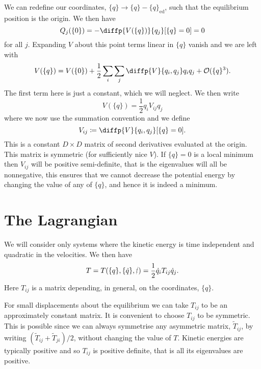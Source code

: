 \documentclass[fleqn]{NotesClass}
\newcommand*{\order}{\mathcal{O}}
\newcommand*{\nodependence}[1]{\textcolor{gray}{\cancel{#1}}}
\begin{document}
    We can redefine our coordinates, \(\{q\} \to \{q\} - \{q\}_{\mathrm{ed}}\), such that the equilibrium position is the origin.
    We then have
    \begin{equation}
        Q_j(\{0\}) = -\diffp{V(\{q\})}{q_j}[\{q\} = 0] = 0
    \end{equation}
    for all \(j\).
    Expanding \(V\) about this point terms linear in \(\{q\}\) vanish and we are left with
    \begin{equation}
        V(\{q\}) = V(\{0\}) + \frac{1}{2}\sum_i\sum_j \diffp{V}{q_i,q_j} q_iq_j + \order(\{q\}^3).
    \end{equation}
    The first term here is just a constant, which we will neglect.
    We then write
    \begin{equation}
        V(\{q\}) = \frac{1}{2}q_iV_{ij}q_j
    \end{equation}
    where we now use the summation convention and we define
    \begin{equation}
        V_{ij} \coloneqq \diffp{V}{q_i,q_j}[\{q\} = 0].
    \end{equation}
    This is a constant \(D \times D\) matrix of second derivatives evaluated at the origin.
    This matrix is symmetric (for sufficiently nice \(V\)).
    If \(\{q\} = 0\) is a local minimum then \(V_{ij}\) will be positive semi-definite, that is the eigenvalues will all be nonnegative, this ensures that we cannot decrease the potential energy by changing the value of any of \(\{q\}\), and hence it is indeed a minimum.
    
    \section{The Lagrangian}
    We will consider only systems where the kinetic energy is time independent and quadratic in the velocities.
    We then have
    \begin{equation}
        T = T(\{q\}, \{\dot{q}\}, \nodependence{t}) = \frac{1}{2}\dot{q}_iT_{ij}\dot{q}_j.
    \end{equation}
    Here \(T_{ij}\) is a matrix depending, in general, on the coordinates, \(\{q\}\).
    
    For small displacements about the equilibrium we can take \(T_{ij}\) to be an approximately constant matrix.
    It is convenient to choose \(T_{ij}\) to be symmetric.
    This is possible since we can always symmetrise any asymmetric matrix, \(\tilde{T}_{ij}\), by writing \((\tilde{T}_{ij} + \tilde{T}_{ji})/2\), without changing the value of \(T\).
    Kinetic energies are typically positive and so \(T_{ij}\) is positive definite, that is all its eigenvalues are positive.
    
\end{document}
